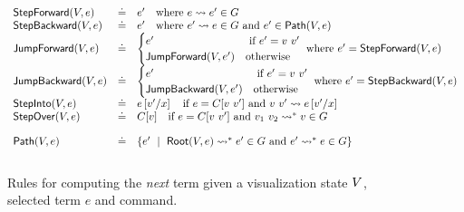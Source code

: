 \begin{figure*}[t]
\[
\begin{array}{lcl}
\stepforward{\vstate}{e}  & \defeq
  & e' \quad \mbox{where } \singlestep{e}{e'} \in \tr \\

\stepbackward{\vstate}{e} & \defeq
  & e' \quad \mbox{where } \singlestep{e'}{e} \in \tr \mbox{ and } e' \in \vpath{\vstate}{e} \\

\jumpforward{\vstate}{e} & \defeq
  & \begin{cases}
    e'                         & \mbox{ if } e' = \eapp{v}{v'} \\
    \jumpforward{\vstate}{e'}  & \text{otherwise}
    \end{cases}
    \mbox{ where } e' = \stepforward{\vstate}{e} \\

\jumpbackward{\vstate}{e} & \defeq
  & \begin{cases}
    e'                         & \mbox{ if } e' = \eapp{v}{v'} \\
    \jumpbackward{\vstate}{e'} & \text{otherwise}
    \end{cases}
    \mbox{ where } e' = \stepbackward{\vstate}{e} \\

\stepinto{\vstate}{e} & \defeq
  & e\sub{x}{v'} \quad \mbox{if } e = C[\eapp{v}{v'}] \mbox{ and } \singlestep{\eapp{v}{v'}}{e\sub{x}{v'}}  \\

\stepover{\vstate}{e} & \defeq
  & C[v] \quad \mbox{if } e = C[\eapp{v}{v'}] \mbox{ and } \multistep{\eapp{v_1}{v_2}}{v} \in \tr \\[0.15in]

\vpath{\vstate}{e} & \defeq
  & \{e' \spmid \multistep{\vroot{\vstate}{e}}{e'} \in \tr
                \mbox{ and }
                \multistep{e'}{e} \in \tr \} \\[0.15in]
\end{array}
\]
\caption{Rules for computing the \emph{next} term given a
         visualization state $\vstate$, selected term $e$
         and command.}
\label{fig:traversing-graph}
\end{figure*}
